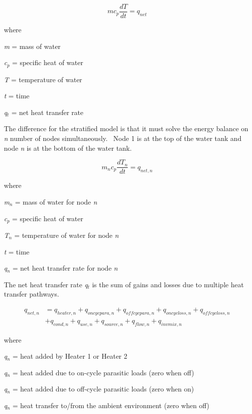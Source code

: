 \begin{equation}
m{c_p}\frac{{dT}}{{dt}} = {q_{net}}
\end{equation}

where

\emph{m} = mass of water

\emph{c\(_{p}\)} = specific heat of water

\emph{T} = temperature of water

\emph{t} = time

\emph{q\(_{t}\)} = net heat transfer rate

The difference for the stratified model is that it must solve the energy balance on \emph{n} number of nodes simultaneously.~ Node 1 is at the top of the water tank and node \emph{n} is at the bottom of the water tank.

\begin{equation}
{m_n}{c_p}\frac{{d{T_n}}}{{dt}} = {q_{net,n}}
\end{equation}

where

\emph{m\(_{n}\)} = mass of water for node \emph{n}

\emph{c\(_{p}\)} = specific heat of water

\emph{T\(_{n}\)} = temperature of water for node \emph{n}

\emph{t} = time

\emph{q\(_{n}\)} = net heat transfer rate for node \emph{n}

The net heat transfer rate \emph{q\(_{t}\)} is the sum of gains and losses due to multiple heat transfer pathways.

\begin{equation}
  \begin{array}{ll}
    q_{net,n} &= q_{heater,n} + q_{oncycpara,n} + q_{offcycpara,n} + q_{oncycloss,n} + q_{offcycloss,n} \\ 
              &+ q_{cond,n} + q_{use,n} + q_{source,n} + q_{flow,n} + q_{invmix,n}
  \end{array}
\end{equation}

where

\emph{q\(_{n}\)} = heat added by Heater 1 or Heater 2

\emph{q\(_{n}\)} = heat added due to on-cycle parasitic loads (zero when off)

\emph{q\(_{n}\)} = heat added due to off-cycle parasitic loads (zero when on)

\emph{q\(_{n}\)} = heat transfer to/from the ambient environment (zero when off)

